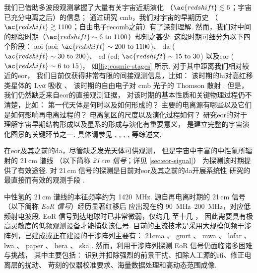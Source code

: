 我们已借助多波段观测掌握了大量有关宇宙近期演化
（$\ac{redshift} \lesssim 6$；宇宙已充分电离之后）的信息；
通过研究 \ac{cmb}，我们对宇宙的早期历史
（$\ac{redshift} \gtrsim 1100$；自由电子\ac{recomb}之前）有了深刻理解.
然而，我们对中间的那段时期（$\ac{redshift} \sim \numrange{6}{1100}$）却知之甚少.
这段时期可细分为以下四个阶段\cite{koopmans2015}：
\acs{aoi} (\acl{aoi}; $\ac{redshift} \sim \numrange{200}{1100}$)、
\acs{da} ($\ac{redshift} \sim \numrange{30}{200}$)、
\acs{cd} (\acl{cd}; $\ac{redshift} \sim \numrange{15}{30}$)
以及\acl{eor} ($\ac{redshift} \sim \numrange{6}{15}$)，
如\autoref{fig:cosmic-stages} 所示.
对于其中距离我们相对较近的\acl{eor}，
我们目前仅获得非常有限的间接观测信息，比如：
该时期的\ac{hi}对高红移类星体的 Lyα 吸收 \cite{becker2001}、
该时期的自由电子对 \ac{cmb} 光子的 Thomson 散射 \cite{kaplinghat2003}.
但是，我们仍然缺乏来自\acl{eor}的直接观测证据，
对该时期的基本性质和关键物理过程仍不清楚，比如：
第一代天体是何时以及如何形成的？
主要的电离源有哪些以及它们是如何影响再电离过程的？
电离氢区的尺度以及演化过程如何？
研究\acl{eor}的对于理解宇宙早期结构形成以及星系的形成与演化有重要意义，
是建立完整的宇宙演化图景的关键环节之一.
具体请参见 , ,
, ,
 等综述文.

在\acl{eor}及其之前的\ac{da}，尽管缺乏发光天体可供观测，
但是宇宙中丰富的中性氢所辐射的 21\,cm 谱线
（以下简称 \emph{21\,cm 信号}；详见 \autoref{sec:eor-signal}）
为探测该时期提供了有效途径.
对 21\,cm 信号的探测是目前对\acl{eor}及其之前的\ac{da}开展系统性
研究的最直接而有效的观测手段
\cite{madau1997,tozzi2000,furlanetto2006,koopmans2015,furlanetto2016}.

中性氢的 21\,cm 谱线的本征频率约为 \SI{1420}{\MHz}.
源自再电离时期的 21\,cm 信号（以下简称 \emph{EoR 信号}）经历显著红移后
应出现在约 \SIrange{90}{200}{\MHz}，对应低频射电波段.
EoR 信号到达地球时已非常微弱，仅约几 \si{\mK} 至十几 \si{\mK}，
因此需要具有极高灵敏度的低频观测设备才能捕获该信号.
目前的主流技术是采用大规模低频干涉阵列，已建成或正在建设的干涉阵列主要有：
\ac{21cma} \cite{zheng2016}、
\ac{gmrt} \cite{paciga2011}、
\ac{mwa} \cite{bowman2013,tingay2013}、
\ac{lofar} \cite{vanHaarlem2013}、
\ac{lwa} \cite{ellingson2009}、
\ac{paper} \cite{parsons2010}、
\ac{hera} \cite{deboer2017}、
\ac{ska} \cite{mellema2013,koopmans2015}.
然而，利用干涉阵列探测 EoR 信号仍面临诸多困难与挑战\cite{wijnholds2010}，
其中主要包括：
识别并扣除强烈的前景干扰、扣除人工源的\ac{rfi}、修正电离层的扰动、
苛刻的仪器校准要求、海量数据处理和高动态范围成像.

